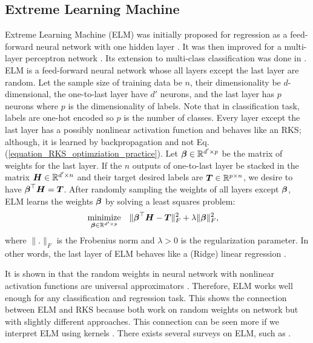 \documentclass{article}
\def\b{\ensuremath\boldsymbol}
\begin{document}
\subsection{Extreme Learning Machine}

Extreme Learning Machine (ELM) was initially proposed for regression as a feed-forward neural network with one hidden layer \cite{huang2006extreme}. 
It was then improved for a multi-layer perceptron network \cite{tang2015extreme}. Its extension to multi-class classification was done in \cite{huang2011extreme}. 
ELM is a feed-forward neural network whose all layers except the last layer are random. Let the sample size of training data be $n$, their dimensionality be $d$-dimensional, the one-to-last layer have $d'$ neurons, and the last layer has $p$ neurons where $p$ is the dimensionality of labels. Note that in classification task, labels are one-hot encoded so $p$ is the number of classes. Every layer except the last layer has a possibly nonlinear activation function and behaves like an RKS; although, it is learned by backpropagation and not Eq. (\ref{equation_RKS_optimziation_practice}). 
Let $\b{\beta} \in \mathbb{R}^{d' \times p}$ be the matrix of weights for the last layer. If the $n$ outputs of one-to-last layer be stacked in the matrix $\b{H} \in \mathbb{R}^{d' \times n}$ and their target desired labels are $\b{T} \in \mathbb{R}^{p \times n}$, we desire to have $\b{\beta}^\top \b{H} = \b{T}$.
After randomly sampling the weights of all layers except $\b{\beta}$, ELM learns the weights $\b{\beta}$ by solving a least squares problem:
\begin{equation}\label{equation_ELM_optimization}
\begin{aligned}
& \underset{\b{\beta} \in \mathbb{R}^{d' \times p}}{\text{minimize}}
& & \|\b{\beta}^\top \b{H} - \b{T}\|_F^2 + \lambda\|\b{\beta}\|_F^2,
\end{aligned}
\end{equation}
where $\|.\|_F$ is the Frobenius norm and $\lambda>0$ is the regularization parameter. In other words, the last layer of ELM behaves like a (Ridge) linear regression \cite{hoerl1970ridge}. 

It is shown in \cite{huang2006universal} that the random weights in neural network with nonlinear activation functions are universal approximators \cite{hornik1989multilayer}. Therefore, ELM works well enough for any classification and regression task. 
This shows the connection between ELM and RKS because both work on random weights on network but with slightly different approaches. This connection can be seen more if we interpret ELM using kernels \cite{huang2014insight}. 
There exists several surveys on ELM, such as \cite{huang2011extreme2,huang2015trends}. 
\end{document}
